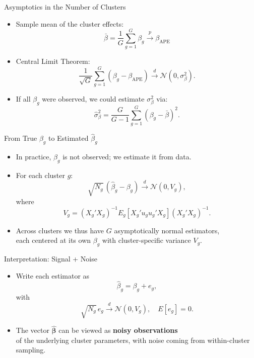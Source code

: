 \documentclass[
  ignorenonframetext,
]{beamer}
\providecommand{\tightlist}{%
  \setlength{\itemsep}{0pt}\setlength{\parskip}{0pt}}
\begin{document}
\begin{frame}{Asymptotics in the Number of Clusters}
\label{asymptotics-in-the-number-of-clusters}
\begin{itemize}
\tightlist
\item
  Sample mean of the cluster effects: \[
  \bar{\beta} = \frac{1}{G}\sum_{g=1}^G \beta_g
  \xrightarrow{p} \beta_{\text{APE}}
  \]
\item
  Central Limit Theorem: \[
  \frac{1}{\sqrt{G}} \sum_{g=1}^G (\beta_g - \beta_{\text{APE}})
  \xrightarrow{d} \mathcal{N}(0,\sigma^2_\beta).
  \]
\item
  If all \(\beta_g\) were observed, we could estimate \(\sigma^2_\beta\)
  via: \[
  \hat{\sigma}^2_\beta
  = \frac{G}{G-1} \sum_{g=1}^G (\beta_g - \bar{\beta})^2.
  \]
\end{itemize}
\end{frame}

\begin{frame}{From True \(\beta_g\) to Estimated \(\hat{\beta}_g\)}
\label{from-true-beta_g-to-estimated-hatbeta_g}
\begin{itemize}
\tightlist
\item
  In practice, \(\beta_g\) is not observed; we estimate it from data.\\
\item
  For each cluster \(g\): \[
  \sqrt{N_g}\,(\hat{\beta}_g - \beta_g)
  \xrightarrow{d}
  \mathcal{N}(0, V_g),
  \] where \[
  V_g = (X_g'X_g)^{-1} E_g[X_g' u_g u_g' X_g] (X_g'X_g)^{-1}.
  \]
\item
  Across clusters we thus have \(G\) asymptotically normal estimators,\\
  each centered at its own \(\beta_g\) with cluster-specific variance
  \(V_g\).
\end{itemize}
\end{frame}

\begin{frame}{Interpretation: Signal + Noise}
\label{interpretation-signal-noise}
\begin{itemize}
\tightlist
\item
  Write each estimator as \[
  \hat{\beta}_g = \beta_g + e_g,
  \] with \[
  \sqrt{N_g}\, e_g \xrightarrow{d} \mathcal{N}(0, V_g),\quad E[e_g]=0.
  \]
\item
  The vector \(\hat{\boldsymbol{\beta}}\) can be viewed as \textbf{noisy
  observations}\\
  of the underlying cluster parameters, with noise coming from
  within-cluster sampling.
\end{itemize}
\end{frame}
\end{document}
